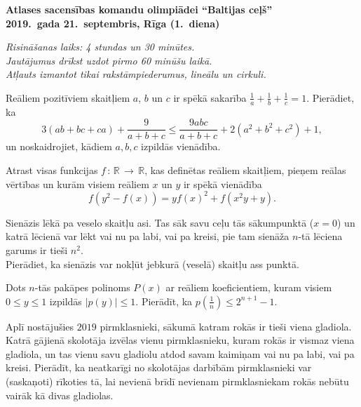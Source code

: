 \documentclass[11pt]{article}
\begin{document}
\begin{center}
{\Large \bf Atlases sacensības komandu olimpiādei ``Baltijas ceļš''}\\
{\bf 2019.\ gada 21.\ septembris, Rīga (1.\ diena)}
\end{center}

{\footnotesize \em 
Risināšanas laiks: 4 stundas un 30 minūtes.\\
Jautājumus drīkst uzdot pirmo 60 minūšu laikā.\\ 
Atļauts izmantot tikai rakstāmpiederumus, lineālu un cirkuli.
}

\begin{problem}[BW.TST.2019.1]
Reāliem pozitīviem skaitļiem $a$, $b$ un $c$ ir spēkā sakarība 
$\frac{1}{a} + \frac{1}{b} + \frac{1}{c} = 1$. Pierādiet, ka 
\[ 3(ab + bc + ca) + \frac{9}{a+b+c} \leq \frac{9abc}{a+b+c} + 2\left( a^2 + b^2 + c^2 \right) + 1, \]
un noskaidrojiet, kādiem $a,b,c$ izpildās vienādība.
\end{problem}


\begin{problem}[BW.TST.2019.2]
Atrast visas funkcijas $f\,:\,\mathbb{R}\,\rightarrow\,\mathbb{R}$, kas definētas reāliem skaitļiem, 
pieņem reālas vērtības un kurām visiem reāliem $x$ un $y$ ir spēkā vienādība
\[ f\left( y^2 - f(x) \right) = yf(x)^2 + f(x^2y + y). \]
\end{problem}

\begin{problem}[BW.TST.2019.3]
Sienāzis lēkā pa veselo skaitļu asi. Tas sāk savu ceļu tās sākumpunktā ($x = 0$) 
un katrā lēcienā var lēkt vai nu pa labi, vai pa kreisi, pie tam sienāža $n$-tā 
lēciena garums ir tieši $n^2$.\\
Pierādiet, ka sienāzis var nokļūt jebkurā (veselā) skaitļu ass punktā. 
\end{problem}

\begin{problem}[BW.TST.2019.4]
Dots $n$-tās pakāpes polinoms $P(x)$ ar reāliem koeficientiem, kuram visiem 
$0 \leq y \leq 1$ izpildās $|p(y)| \leq 1$. 
Pierādīt, ka $p\left( \frac{1}{n} \right) \leq 2^{n+1} - 1$.
\end{problem}


\begin{problem}[BW.TST.2019.5]
Aplī nostājušies $2019$ pirmklasnieki, sākumā katram rokās ir tieši viena gladiola. 
Katrā gājienā skolotāja izvēlas vienu pirmklasnieku, kuram rokās ir vismaz viena gladiola, 
un tas vienu savu gladiolu atdod savam kaimiņam vai nu pa labi, vai pa kreisi. 
Pierādīt, ka neatkarīgi no skolotājas darbībām pirmklasnieki var (saskaņoti) rīkoties 
tā, lai nevienā brīdī nevienam pirmklasniekam rokās nebūtu vairāk kā divas gladiolas.
\end{problem}
\end{document}
